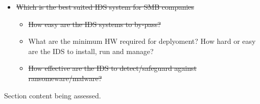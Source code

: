 \begin{notes}

    \begin{itemize}
        \item \sout{Which is the best suited IDS system for SMB companies}
        \begin{itemize}
            \item \sout{How easy are the IDS systems to by-pass?}
            \item What are the minimum HW required for deplyoment? How hard or easy are the IDS to install, run and manage?
            \item \sout{How effective are the IDS to detect/safeguard against ransomeware/malware?}
        \end{itemize}

    \end{itemize}
    
    Section content being assessed.
    
\end{notes}